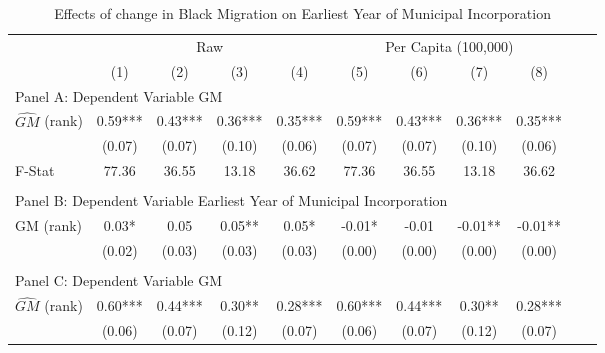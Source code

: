  \begin{table}[htbp]\centering {} \begin{threeparttable} \caption{Effects of change in Black Migration on Earliest Year of Municipal Incorporation} \begin{tabular}{l*{10}{c}} \toprule
                &\multicolumn{4}{c}{Raw}                                    &\multicolumn{4}{c}{Per Capita (100,000)}                   \\\cmidrule(lr){2-5}\cmidrule(lr){6-9}
                &\multicolumn{1}{c}{(1)}   &\multicolumn{1}{c}{(2)}   &\multicolumn{1}{c}{(3)}   &\multicolumn{1}{c}{(4)}   &\multicolumn{1}{c}{(5)}   &\multicolumn{1}{c}{(6)}   &\multicolumn{1}{c}{(7)}   &\multicolumn{1}{c}{(8)}   \\
\cmidrule(lr){1-9}
\multicolumn{8}{l}{Panel A: Dependent Variable GM}\\
\cmidrule(lr){1-9}
$\hat{GM}$ (rank)&       0.59***&       0.43***&       0.36***&       0.35***&       0.59***&       0.43***&       0.36***&       0.35***\\
                &     (0.07)   &     (0.07)   &     (0.10)   &     (0.06)   &     (0.07)   &     (0.07)   &     (0.10)   &     (0.06)   \\
\midrule
F-Stat          &      77.36   &      36.55   &      13.18   &      36.62   &      77.36   &      36.55   &      13.18   &      36.62   \\
\cmidrule[\heavyrulewidth](lr){1-9} \\ \cmidrule[\heavyrulewidth](lr){1-9}
\multicolumn{8}{l}{Panel B: Dependent Variable Earliest Year of Municipal Incorporation}\\
\cmidrule(lr){1-9}
GM  (rank)      &       0.03*  &       0.05   &       0.05** &       0.05*  &      -0.01*  &      -0.01   &      -0.01** &      -0.01** \\
                &     (0.02)   &     (0.03)   &     (0.03)   &     (0.03)   &     (0.00)   &     (0.00)   &     (0.00)   &     (0.00)   \\
\cmidrule[\heavyrulewidth](lr){1-9} \\ \cmidrule[\heavyrulewidth](lr){1-9}
\multicolumn{8}{l}{Panel C: Dependent Variable GM}\\
\cmidrule(lr){1-9}
$\hat{GM}$ (rank)&       0.60***&       0.44***&       0.30** &       0.28***&       0.60***&       0.44***&       0.30** &       0.28***\\
                &     (0.06)   &     (0.07)   &     (0.12)   &     (0.07)   &     (0.06)   &     (0.07)   &     (0.12)   &     (0.07)   \\

\end{tabular}
\end{threeparttable}
\end{table}
